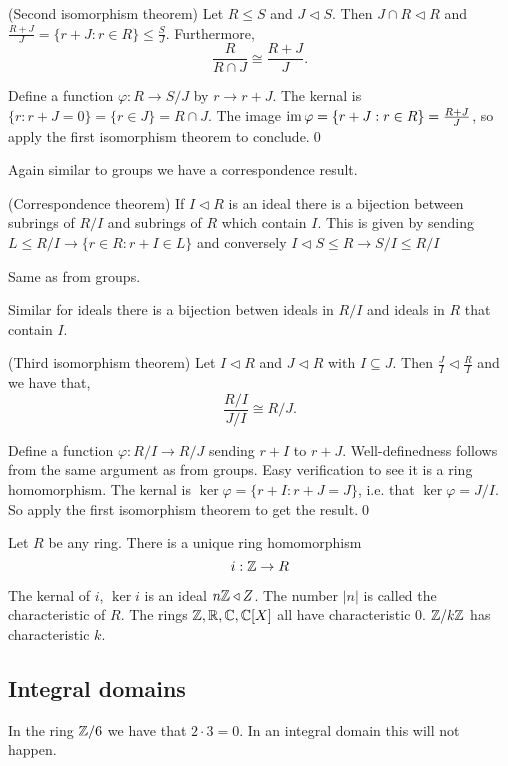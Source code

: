 \documentclass{article}
\newcommand{\nrm}{\triangleleft}
\begin{document}
\begin{theorem}
	(Second isomorphism theorem) Let $ R\le S $ and $ J\nrm S $. Then $ J\cap R\nrm R $ and $ \frac{R+J}{J}=\{r+J:r\in R\}\le \frac SJ $. Furthermore,
	\[
		\frac{R}{R\cap J}\cong \frac{R+J}J.
	\]
\end{theorem}
\pf Define a function $ \varphi:R\to S/J $ by $ r\to r+J $. The kernal is $ \{r:r+J=0\}=\{r\in J\}=R\cap J $. The image $ \operatorname{im}\varphi=\{r+J:r\in R\}=\frac{R+J}J $, so apply the first isomorphism theorem to conclude.\qed
\par
Again similar to groups we have a correspondence result.
\begin{theorem}
	(Correspondence theorem) If $ I\nrm R $ is an ideal there is a bijection between subrings of $ R/I $ and subrings of $ R $ which contain $ I $. This is given by sending $ L\le R/I\to \{r\in R: r+I\in L\} $ and conversely $ I\nrm S\le R\to S/I\le R/I $
\end{theorem}
\pf Same as from groups.
\par
Similar for ideals there is a bijection betwen ideals in $ R/I $ and ideals in $ R $ that contain $ I $.
\begin{theorem}
	(Third isomorphism theorem) Let $ I\nrm R $ and $ J\nrm R $ with $ I\subseteq J $. Then $ \frac JI\nrm \frac RI $ and we have that,
	\[
		\frac{R/I}{J/I}\cong R/J.
	\]
\end{theorem}
\pf Define a function $\varphi: R/I\to R/J $ sending $ r+I $ to $ r+J $. Well-definedness follows from the same argument as from groups. Easy verification to see it is a ring homomorphism.
The kernal is $ \ker\varphi=\{r+I:r+J=J\} $, i.e. that $ \ker\varphi=J/I $. So apply the first isomorphism theorem to get the result.\qed
\begin{claim}
  Let $ R $ be any ring. There is a unique ring homomorphism
  \[
	  i:\mathbb{Z}\to R
  \]
\end{claim}
The kernal of $ i $, $ \ker i $ is an ideal $ n\Z\nrm Z $. The number $ |n| $ is called the characteristic of $ R $. The rings $ \mathbb{Z},\mathbb{R},\mathbb{C},\mathbb{C}[X] $ all have characteristic 0. $ \mathbb{Z}/k\mathbb{Z} $ has characteristic $ k $.
\subsection{Integral domains}
In the ring $ \mathbb{Z}/6 $ we have that $ 2\cdot 3 = 0 $. In an integral domain this will not happen.
\end{document}
